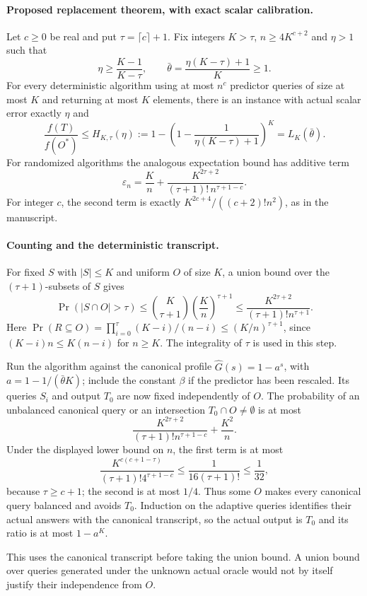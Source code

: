 \paragraph{Proposed replacement theorem, with exact scalar calibration.}
Let $c\ge0$ be real and put $\tau=\lceil c\rceil+1$. Fix integers
$K>\tau$, $n\ge4K^{c+2}$ and $\eta>1$ such that
\[
 \eta\ge\frac{K-1}{K-\tau},\qquad
 \bar\theta=\frac{\eta(K-\tau)+1}{K}\ge1.
\]
For every deterministic algorithm using at most $n^c$ predictor queries of
size at most $K$ and returning at most $K$ elements, there is an instance
with actual scalar error exactly $\eta$ and
\[
 \frac{f(T)}{f(O^*)}\le
 H_{K,\tau}(\eta):=
 1-\left(1-\frac1{\eta(K-\tau)+1}\right)^K
 =L_K(\bar\theta).
\]
For randomized algorithms the analogous expectation bound has additive term
\[
 \varepsilon_n=\frac Kn+
 \frac{K^{2\tau+2}}{(\tau+1)!\,n^{\tau+1-c}}.
\]
For integer $c$, the second term is exactly
$K^{2c+4}/((c+2)!n^2)$, as in the manuscript.

\paragraph{Counting and the deterministic transcript.}
For fixed $S$ with $|S|\le K$ and uniform $O$ of size $K$, a union bound over
the $(\tau+1)$-subsets of $S$ gives
\[
 \Pr(|S\cap O|>\tau)
 \le\binom K{\tau+1}\left(\frac Kn\right)^{\tau+1}
 \le\frac{K^{2\tau+2}}{(\tau+1)!n^{\tau+1}}.
\]
Here $\Pr(R\subseteq O)=\prod_{i=0}^{\tau}(K-i)/(n-i)\le(K/n)^{\tau+1}$,
since $(K-i)n\le K(n-i)$ for $n\ge K$. The integrality of $\tau$ is used
in this step.

Run the algorithm against the canonical profile
$\hat G(s)=1-a^s$, with $a=1-1/(\bar\theta K)$; include the constant
$\beta$ if the predictor has been rescaled. Its queries $S_i$ and output
$T_0$ are now fixed independently of $O$. The probability of an unbalanced
canonical query or an intersection $T_0\cap O\ne\emptyset$ is at most
\[
 \frac{K^{2\tau+2}}{(\tau+1)!n^{\tau+1-c}}+\frac{K^2}{n}.
\]
Under the displayed lower bound on $n$, the first term is at most
\[
 \frac{K^{c(c+1-\tau)}}{(\tau+1)!4^{\tau+1-c}}
 \le\frac1{16(\tau+1)!}\le\frac1{32},
\]
because $\tau\ge c+1$; the second is at most $1/4$. Thus some $O$ makes
every canonical query balanced and avoids $T_0$. Induction on the adaptive
queries identifies their actual answers with the canonical transcript, so
the actual output is $T_0$ and its ratio is at most $1-a^K$.

This uses the canonical transcript before taking the union bound. A union
bound over queries generated under the unknown actual oracle would not by
itself justify their independence from $O$.

